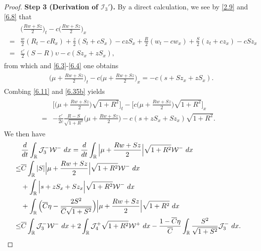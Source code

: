 \documentclass[10pt,a4paper]{amsart}
\newcommand{\fr}{\frac}
\begin{document}
\begin{proof}
\textbf{Step 3 (Derivation of $\mathcal{I}_{3}'$).}
By a direct calculation, we see by \eqref{2.9} and \eqref{6.8} that
\begin{align}\label{6.35a}
\begin{split}
&\Big(\fr{Rw+Sz}{2}\Big)_t-c\Big(\fr{Rw+Sz}{2}\Big)_x \\
=&\fr{w}{2}(R_t-cR_x)+\fr{z}{2}(S_t+cS_x) -czS_x  +\fr{R}{2}(w_t-cw_x) +\fr{S}{2}(z_t+cz_x) -cSz_x \\
=&\fr{c'}{2}(S-R)\upsilon- c(Sz_x+zS_x),
\end{split}
\end{align}
from which and \eqref{6.3}-\eqref{6.4} one obtains
\begin{align}\label{6.35b}
\begin{split}
&\Big(\mu +\fr{Rw+Sz}{2}\Big)_t-c\Big(\mu+\fr{Rw+Sz}{2}\Big)_x =- c(s+Sz_x+zS_x).
\end{split}
\end{align}
Combing \eqref{6.11} and \eqref{6.35b} yields
\begin{align}\label{6.35c}
\begin{split}
&\Big[\Big(\mu +\fr{Rw+Sz}{2}\Big)\sqrt{1+R^2}\Big]_t -\Big[c\Big(\mu +\fr{Rw+Sz}{2}\Big)\sqrt{1+R^2}\Big]_x \\
=&-\fr{c'}{2c}\fr{R-S}{\sqrt{1+R^2}}\Big(\mu +\fr{Rw+Sz}{2}\Big) -c(s+zS_x +Sz_x)\sqrt{1+R^2}.
\end{split}
\end{align}
We then have
\begin{align}\label{6.35d}
\begin{split}
&\fr{{\rm d}}{{\rm d}t}\int_{\mathbb{R}} \mathcal{J}_{3}^-\mathcal{W}^-\ {\rm d}x=\fr{{\rm d}}{{\rm d}t}\int_{\mathbb{R}} \Big|\mu +\fr{Rw+Sz}{2}\Big|\sqrt{1+R^2}\mathcal{W}^-\ {\rm d}x \\
\leq & \overline{C}\int_{\mathbb{R}}  |S|\Big|\mu +\fr{Rw+Sz}{2}\Big|\sqrt{1+R^2}\mathcal{W}^-\ {\rm d}x \\
&+\int_{\mathbb{R}}  \Big|s+zS_x+Sz_x\Big|\sqrt{1+R^2}\mathcal{W}^-\ {\rm d}x \\
&+\int_{\mathbb{R}}  \Big(\overline{C}\eta-\fr{2S^2}{\overline{C}\sqrt{1+S^2}}\Big) \Big|\mu +\fr{Rw+Sz}{2}\Big|\sqrt{1+R^2}\ {\rm d}x
\\
\leq & \overline{C}\int_{\mathbb{R}}  \mathcal{J}_{3}^-\mathcal{W}^-\ {\rm d}x  +2\int_{\mathbb{R}}  \mathcal{J}_{4}^+\sqrt{1+R^2}\mathcal{W}^+\ {\rm d}x  -\fr{1-\overline{C}\eta}{\overline{C}}\int_{\mathbb{R}}  \fr{S^2}{\sqrt{1+S^2}} \mathcal{J}_{3}^-\ {\rm d}x.
\end{split}

\end{align}
\end{proof}
\end{document}
